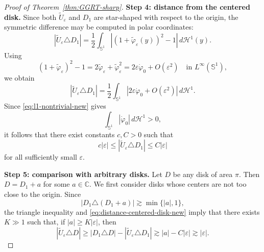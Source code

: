 \documentclass[a4paper,11pt,reqno]{amsart}
\numberwithin{equation}{section}
\theoremstyle{plain} %
\theoremstyle{definition} %
\theoremstyle{remark}
\newcommand{\C}{\mathbb{C}}
\begin{document}
\begin{proof}[Proof of Theorem~\ref{thm:GGRT-sharp}]
\medskip
\noindent
{\bf Step 4: distance from the centered disk.} Since both $\widetilde U_\varepsilon$ and $D_1$ are star-shaped with respect to
the origin, the symmetric difference may be computed in polar coordinates:
\[
|\widetilde U_\varepsilon \triangle D_1|
=
\frac12\int_{\mathbb S^1}
\left|(1+\widetilde\varphi_\varepsilon(y))^2-1\right|
\,d\mathcal H^1(y).
\]
Using
\[
(1+\widetilde\varphi_\varepsilon)^2-1
=
2\widetilde\varphi_\varepsilon+\widetilde\varphi_\varepsilon^2
=
2\varepsilon \dot\varphi_0 + O(\varepsilon^2)
\quad \text{in } L^\infty(\mathbb S^1),
\]
we obtain
\[
|\widetilde U_\varepsilon \triangle D_1|
=
\frac12\int_{\mathbb S^1}
\left|2\varepsilon \dot\varphi_0 + O(\varepsilon^2)\right|
\,d\mathcal H^1.
\]
Since \eqref{eq:l1-nontrivial-new} gives
\[
\int_{\mathbb S^1} |\dot\varphi_0|\,d\mathcal H^1>0,
\]
it follows that there exist constants $c,C>0$ such that
\begin{equation}\label{eq:distance-centered-disk-new}
c|\varepsilon|
\leq
|\widetilde U_\varepsilon \triangle D_1|
\leq
C|\varepsilon|
\end{equation}
for all sufficiently small $\varepsilon$.

\medskip
\noindent
{\bf Step 5: comparison with arbitrary disks.} Let $D$ be any disk of area $\pi$. Then $D=D_1+a$ for some $a\in \C$. We first consider disks whose centers are not too close to the origin.
Since
\[
|D_1\triangle (D_1+a)|
\gtrsim \min\{|a|,1\},
\]
the triangle inequality and \eqref{eq:distance-centered-disk-new} imply that
there exists $K\gg 1$ such that, if $|a|\geq K|\varepsilon|$, then
\begin{equation}\label{eq:far-disks-new}
|\widetilde U_\varepsilon \triangle D|
\geq
|D_1\triangle D|-|\widetilde U_\varepsilon\triangle D_1|
\gtrsim
|a|-C|\varepsilon|
\gtrsim
|\varepsilon|.
\end{equation}


\end{proof}
\end{document}
